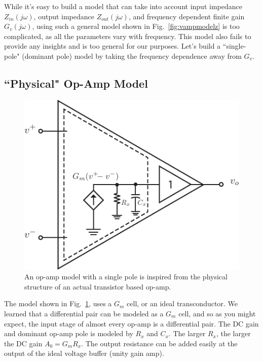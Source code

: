 While it's easy to build a model that can take into account input impedance $Z_{in}(j\omega)$, output impedance $Z_{out}(j\omega)$, and frequency dependent finite gain $G_v(j\omega)$, using such a general model shown in Fig.~\ref{fig:vampmodelz} is too complicated, as all the parameters vary with frequency.  This model also fails to provide any insights and is too general for our purposes.  Let's build a ``single-pole" (dominant pole) model by taking the frequency dependence away from $G_v$.
\subsection{``Physical" Op-Amp Model}
\begin{figure}[tb]
\begin{center}
\includegraphics[scale=1]{opamp_model_pole}
\end{center}
\caption{An op-amp model with a single pole is inspired from the physical structure of an actual transistor based op-amp.}
\label{fig:opamp_model_pole}
\end{figure}

The model shown in Fig.~\ref{fig:opamp_model_pole}, uses a $G_m$ cell, or an ideal transconductor.  We learned that a differential pair can be modeled as a $G_m$ cell, and so as you might expect, the input stage of almost every op-amp is a differential pair.  The DC gain and dominant op-amp pole is modeled by $R_x$ and $C_x$.  The larger $R_x$, the larger the DC gain $A_0 = G_m R_x$.  The output resistance can be added easily at the output of the ideal voltage buffer (unity gain amp).

